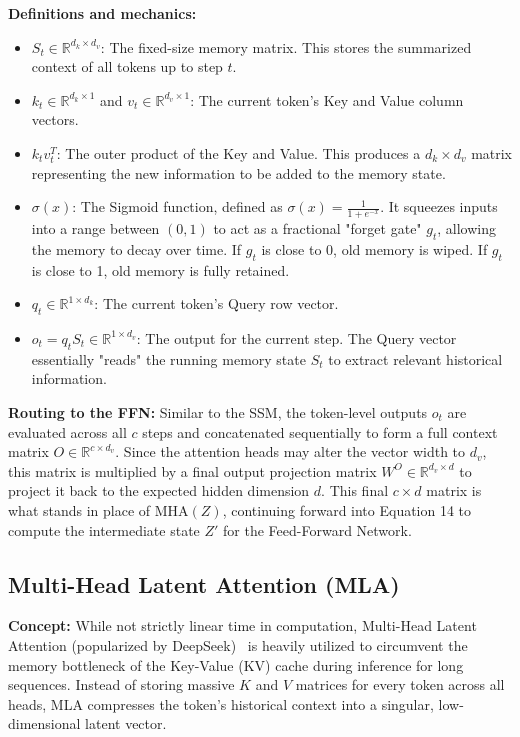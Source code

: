 \documentclass[11pt]{article}
\begin{document}
	\textbf{Definitions and mechanics:}
	\begin{itemize}
		\item $S_t \in \mathbb{R}^{d_k \times d_v}$: The fixed-size memory matrix.
		This stores the summarized context of all tokens up to step $t$.
		\item $k_t \in \mathbb{R}^{d_k \times 1}$ and $v_t \in \mathbb{R}^{d_v \times 1}$: The current token's Key and Value column vectors.
		\item $k_t v_t^T$: The outer product of the Key and Value.
		This produces a $d_k \times d_v$ matrix representing the new information to be added to the memory state.
		\item $\sigma(x)$: The Sigmoid function, defined as $\sigma(x) = \frac{1}{1 + e^{-x}}$.
		It squeezes inputs into a range between $(0, 1)$ to act as a fractional "forget gate" $g_t$, allowing the memory to decay over time.
		If $g_t$ is close to 0, old memory is wiped.
		If $g_t$ is close to 1, old memory is fully retained.
		\item $q_t \in \mathbb{R}^{1 \times d_k}$: The current token's Query row vector.
		\item $o_t = q_t S_t \in \mathbb{R}^{1 \times d_v}$: The output for the current step.
		The Query vector essentially "reads" the running memory state $S_t$ to extract relevant historical information.
	\end{itemize}
	
	\textbf{Routing to the FFN:}
	Similar to the SSM, the token-level outputs $o_t$ are evaluated across all $c$ steps and concatenated sequentially to form a full context matrix $O \in \mathbb{R}^{c \times d_v}$. Since the attention heads may alter the vector width to $d_v$, this matrix is multiplied by a final output projection matrix $W^O \in \mathbb{R}^{d_v \times d}$ to project it back to the expected hidden dimension $d$. This final $c \times d$ matrix is what stands in place of $\text{MHA}(Z)$, continuing forward into Equation 14 to compute the intermediate state $Z'$ for the Feed-Forward Network.
	
	\subsection{Multi-Head Latent Attention (MLA)}
	\textbf{Concept:} While not strictly linear time in computation, Multi-Head Latent Attention (popularized by DeepSeek)~\cite{deepseek2024v2} is heavily utilized to circumvent the memory bottleneck of the Key-Value (KV) cache during inference for long sequences. Instead of storing massive $K$ and $V$ matrices for every token across all heads, MLA compresses the token's historical context into a singular, low-dimensional latent vector.
	
\end{document}
